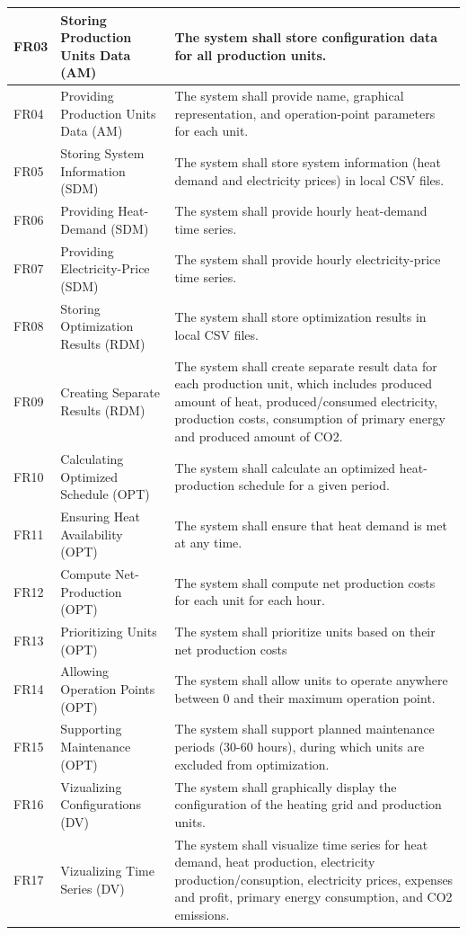 \begin{table}[H]
    \centering
    \begin{tabular}{|p{1.3cm}|p{3.5cm}|p{9.5cm}|}   
        \hline
        FR03 & Storing Production Units Data (AM) & The system shall store configuration data for all production units. \\
        \hline
        FR04 & Providing Production Units Data (AM) & The system shall provide name, graphical representation, and operation-point parameters for each unit.  \\
        \hline
        FR05 & Storing System Information (SDM) & The system shall store system information (heat demand and electricity prices) in local CSV files. \\
        \hline
        FR06 & Providing Heat-Demand (SDM) & The system shall provide hourly heat-demand time series. \\
        \hline
        FR07 & Providing Electricity-Price (SDM) & The system shall provide hourly electricity-price time series. \\
        \hline
        FR08 & Storing Optimization Results (RDM) & The system shall store optimization results in local CSV files. \\
        \hline
        FR09 & Creating Separate Results (RDM) & The system shall create separate result data for each production unit, which includes produced amount of heat, produced/consumed electricity, production costs, consumption of primary energy and produced amount of CO2. \\
        \hline
        FR10 & Calculating Optimized Schedule (OPT) & The system shall calculate an optimized heat-production schedule for a given period. \\
        \hline
        FR11 & Ensuring Heat Availability (OPT) & The system shall ensure that heat demand is met at any time. \\
        \hline
        FR12 & Compute Net-Production (OPT) & The system shall compute net production costs for each unit for each hour. \\
        \hline
        FR13 & Prioritizing Units (OPT) & The system shall prioritize units based on their net production costs \\
        \hline
        FR14 & Allowing Operation Points (OPT) & The system shall allow units to operate anywhere between 0 and their maximum operation point. \\
        \hline
        FR15 & Supporting Maintenance (OPT) & The system shall support planned maintenance periods (30-60 hours), during which units are excluded from optimization. \\
        \hline
        FR16 & Vizualizing Configurations (DV) & The system shall graphically display the configuration of the heating grid and production units. \\
        \hline
        FR17 & Vizualizing Time Series (DV) & The system shall visualize time series for heat demand, heat production, electricity production/consuption, electricity prices, expenses and profit, primary energy consumption, and CO2 emissions. \\
        \hline
    \end{tabular}
\end{table}
